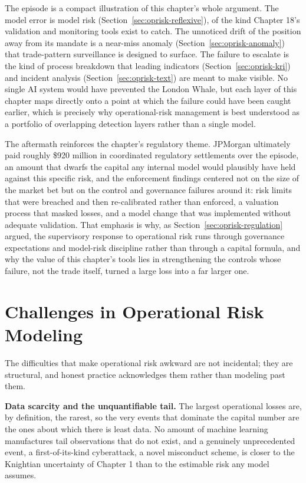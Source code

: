 \documentclass[../ai_in_finance]{subfiles}
\begin{document}
The episode is a compact illustration of this chapter's whole argument. The model error is model risk (Section~\ref{sec:oprisk-reflexive}), of the kind Chapter 18's validation and monitoring tools exist to catch. The unnoticed drift of the position away from its mandate is a near-miss anomaly (Section~\ref{sec:oprisk-anomaly}) that trade-pattern surveillance is designed to surface. The failure to escalate is the kind of process breakdown that leading indicators (Section~\ref{sec:oprisk-kri}) and incident analysis (Section~\ref{sec:oprisk-text}) are meant to make visible. No single AI system would have prevented the London Whale, but each layer of this chapter maps directly onto a point at which the failure could have been caught earlier, which is precisely why operational-risk management is best understood as a portfolio of overlapping detection layers rather than a single model.

The aftermath reinforces the chapter's regulatory theme. JPMorgan ultimately paid roughly \$920 million in coordinated regulatory settlements over the episode, an amount that dwarfs the capital any internal model would plausibly have held against this specific risk, and the enforcement findings centered not on the size of the market bet but on the control and governance failures around it: risk limits that were breached and then re-calibrated rather than enforced, a valuation process that masked losses, and a model change that was implemented without adequate validation. That emphasis is why, as Section~\ref{sec:oprisk-regulation} argued, the supervisory response to operational risk runs through governance expectations and model-risk discipline rather than through a capital formula, and why the value of this chapter's tools lies in strengthening the controls whose failure, not the trade itself, turned a large loss into a far larger one.

\section{Challenges in Operational Risk Modeling}
\label{sec:oprisk-challenges}

The difficulties that make operational risk awkward are not incidental; they are structural, and honest practice acknowledges them rather than modeling past them.

\textbf{Data scarcity and the unquantifiable tail.} The largest operational losses are, by definition, the rarest, so the very events that dominate the capital number are the ones about which there is least data. No amount of machine learning manufactures tail observations that do not exist, and a genuinely unprecedented event, a first-of-its-kind cyberattack, a novel misconduct scheme, is closer to the Knightian uncertainty of Chapter 1 than to the estimable risk any model assumes.
\end{document}
